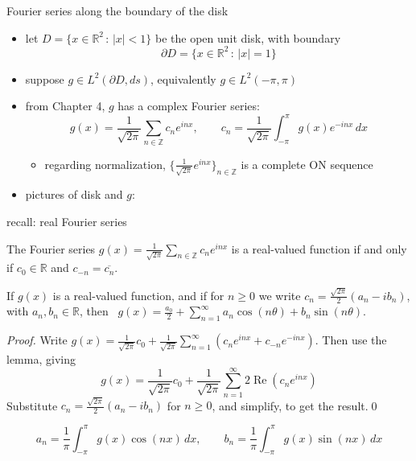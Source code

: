 \documentclass[10pt,
               svgnames,
               hyperref={colorlinks,
                         citecolor=DeepPink4,
                         linkcolor=FireBrick,
                         urlcolor=blue},
               usepdftitle=false]{beamer}
\newcommand{\RR}{\mathbb{R}}
\newcommand{\ZZ}{\mathbb{Z}}
\renewcommand{\Re}{\operatorname{Re}}
\newcommand{\ds}{\displaystyle}
\begin{document}
\begin{frame}{Fourier series along the boundary of the disk}

\begin{itemize}
\item let $D = \{x\in \RR^2\,:\,|x|<1\}$ be the open unit disk, with boundary
	$$\partial D = \{x\in \RR^2\,:\,|x|=1\}$$
\item suppose $g\in L^2(\partial D,ds)$, equivalently $g\in L^2(-\pi,\pi)$
\item from Chapter 4, $g$ has a complex Fourier series:
	$$g(x) = \frac{1}{\sqrt{2\pi}} \sum_{n\in\ZZ} c_n e^{inx}, \qquad c_n = \frac{1}{\sqrt{2\pi}} \int_{-\pi}^\pi g(x) e^{-inx}\,dx$$

    \begin{itemize}
    \item[$\circ$] regarding normalization, $\{\frac{1}{\sqrt{2\pi}} e^{inx}\}_{n\in\ZZ}$ is a complete ON sequence
    \end{itemize}
\item pictures of disk and $g$:

\vspace{30mm}
\end{itemize}
\end{frame}


\begin{frame}{recall: real Fourier series}

\small

\begin{lemma}  The Fourier series $g(x) = \frac{1}{\sqrt{2\pi}} \sum_{n\in\ZZ} c_n e^{inx}$ is a real-valued function if and only if $c_0\in\RR$ and $c_{-n} = \overline{c_n}$.
\end{lemma}

\begin{corollary}  If $g(x)$ is a real-valued function, and if for $n\ge 0$ we write $c_n = \frac{\sqrt{2\pi}}{2} (a_n-i b_n)$, with $a_n,b_n\in\RR$, then \, $\ds g(x) = \frac{a_0}{2} + \sum_{n=1}^\infty a_n \cos(n\theta) + b_n \sin(n\theta)$.
\end{corollary}

\footnotesize
\noindent \emph{Proof.} Write $g(x) = \frac{1}{\sqrt{2\pi}} c_0 + \frac{1}{\sqrt{2\pi}} \sum_{n=1}^\infty \left(c_n e^{inx} + c_{-n} e^{-inx}\right)$.  Then use the lemma, giving
	$$g(x) = \frac{1}{\sqrt{2\pi}} c_0 + \frac{1}{\sqrt{2\pi}} \sum_{n=1}^\infty 2 \Re \left(c_n e^{inx}\right)$$
Substitute $c_n = \frac{\sqrt{2\pi}}{2} (a_n-i b_n)$ for $n\ge 0$, and simplify, to get the result.\qed
\small

\begin{lemma}
    $$a_n = \frac{1}{\pi} \int_{-\pi}^\pi g(x)\cos(nx)\,dx, \qquad b_n = \frac{1}{\pi} \int_{-\pi}^\pi g(x)\sin(nx)\,dx$$
\end{lemma}
\end{frame}
\end{document}

